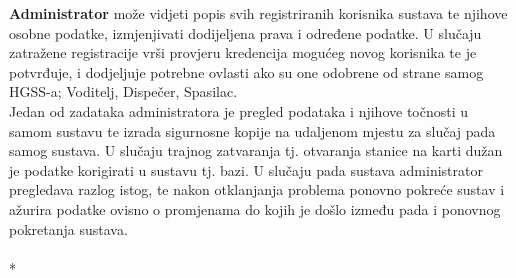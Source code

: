 {			\textbf{Administrator} može vidjeti popis svih registriranih korisnika sustava te njihove osobne podatke, izmjenjivati dodijeljena prava i određene podatke. U slučaju zatražene registracije vrši provjeru kredencija mogućeg novog korisnika te je potvrđuje, i dodjeljuje potrebne ovlasti ako su one odobrene od strane samog HGSS-a; Voditelj, Dispečer, Spasilac. \\ Jedan od zadataka administratora je pregled podataka i njihove točnosti u samom sustavu te izrada sigurnosne kopije na udaljenom mjestu za slučaj pada samog sustava. U slučaju trajnog zatvaranja tj. otvaranja stanice na karti dužan je podatke korigirati u sustavu tj. bazi. U slučaju pada sustava administrator pregledava razlog istog, te nakon otklanjanja problema ponovno pokreće sustav i ažurira podatke ovisno o promjenama do kojih je došlo između pada i ponovnog pokretanja sustava.\\}\\*
		
		
